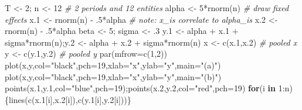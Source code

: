 \documentclass[
  12pt,
]{book}
\newenvironment{Shaded}{\begin{snugshade}}{\end{snugshade}}
\newcommand{\AttributeTok}[1]{\textcolor[rgb]{0.77,0.63,0.00}{#1}}
\newcommand{\CommentTok}[1]{\textcolor[rgb]{0.56,0.35,0.01}{\textit{#1}}}
\newcommand{\ControlFlowTok}[1]{\textcolor[rgb]{0.13,0.29,0.53}{\textbf{#1}}}
\newcommand{\DecValTok}[1]{\textcolor[rgb]{0.00,0.00,0.81}{#1}}
\newcommand{\FloatTok}[1]{\textcolor[rgb]{0.00,0.00,0.81}{#1}}
\newcommand{\FunctionTok}[1]{\textcolor[rgb]{0.00,0.00,0.00}{#1}}
\newcommand{\NormalTok}[1]{#1}
\newcommand{\OtherTok}[1]{\textcolor[rgb]{0.56,0.35,0.01}{#1}}
\newcommand{\SpecialCharTok}[1]{\textcolor[rgb]{0.00,0.00,0.00}{#1}}
\newcommand{\StringTok}[1]{\textcolor[rgb]{0.31,0.60,0.02}{#1}}
\theoremstyle{definition}
\theoremstyle{definition}
\theoremstyle{definition}
\theoremstyle{definition}
\theoremstyle{remark}
\begin{document}
\begin{Shaded}
\begin{Highlighting}[]
\NormalTok{T }\OtherTok{\textless{}{-}} \DecValTok{2}\NormalTok{; n }\OtherTok{\textless{}{-}} \DecValTok{12} \CommentTok{\# 2 periods and 12 entities}
\NormalTok{alpha }\OtherTok{\textless{}{-}} \DecValTok{5}\SpecialCharTok{*}\FunctionTok{rnorm}\NormalTok{(n) }\CommentTok{\# draw fixed effects}
\NormalTok{x}\FloatTok{.1} \OtherTok{\textless{}{-}} \FunctionTok{rnorm}\NormalTok{(n) }\SpecialCharTok{{-}}\NormalTok{ .}\DecValTok{5}\SpecialCharTok{*}\NormalTok{alpha }\CommentTok{\# note: x\_i\textquotesingle{}s correlate to alpha\_i\textquotesingle{}s}
\NormalTok{x}\FloatTok{.2} \OtherTok{\textless{}{-}} \FunctionTok{rnorm}\NormalTok{(n) }\SpecialCharTok{{-}}\NormalTok{ .}\DecValTok{5}\SpecialCharTok{*}\NormalTok{alpha}
\NormalTok{beta }\OtherTok{\textless{}{-}} \DecValTok{5}\NormalTok{; sigma }\OtherTok{\textless{}{-}}\NormalTok{ .}\DecValTok{3}
\NormalTok{y}\FloatTok{.1} \OtherTok{\textless{}{-}}\NormalTok{ alpha }\SpecialCharTok{+}\NormalTok{ x}\FloatTok{.1} \SpecialCharTok{+}\NormalTok{ sigma}\SpecialCharTok{*}\FunctionTok{rnorm}\NormalTok{(n);y}\FloatTok{.2} \OtherTok{\textless{}{-}}\NormalTok{ alpha }\SpecialCharTok{+}\NormalTok{ x}\FloatTok{.2} \SpecialCharTok{+}\NormalTok{ sigma}\SpecialCharTok{*}\FunctionTok{rnorm}\NormalTok{(n)}
\NormalTok{x }\OtherTok{\textless{}{-}} \FunctionTok{c}\NormalTok{(x}\FloatTok{.1}\NormalTok{,x}\FloatTok{.2}\NormalTok{) }\CommentTok{\# pooled x}
\NormalTok{y }\OtherTok{\textless{}{-}} \FunctionTok{c}\NormalTok{(y}\FloatTok{.1}\NormalTok{,y}\FloatTok{.2}\NormalTok{) }\CommentTok{\# pooled y}
\FunctionTok{par}\NormalTok{(}\AttributeTok{mfrow=}\FunctionTok{c}\NormalTok{(}\DecValTok{1}\NormalTok{,}\DecValTok{2}\NormalTok{))}
\FunctionTok{plot}\NormalTok{(x,y,}\AttributeTok{col=}\StringTok{"black"}\NormalTok{,}\AttributeTok{pch=}\DecValTok{19}\NormalTok{,}\AttributeTok{xlab=}\StringTok{"x"}\NormalTok{,}\AttributeTok{ylab=}\StringTok{"y"}\NormalTok{,}\AttributeTok{main=}\StringTok{"(a)"}\NormalTok{)}
\FunctionTok{plot}\NormalTok{(x,y,}\AttributeTok{col=}\StringTok{"black"}\NormalTok{,}\AttributeTok{pch=}\DecValTok{19}\NormalTok{,}\AttributeTok{xlab=}\StringTok{"x"}\NormalTok{,}\AttributeTok{ylab=}\StringTok{"y"}\NormalTok{,}\AttributeTok{main=}\StringTok{"(b)"}\NormalTok{)}
\FunctionTok{points}\NormalTok{(x}\FloatTok{.1}\NormalTok{,y}\FloatTok{.1}\NormalTok{,}\AttributeTok{col=}\StringTok{"blue"}\NormalTok{,}\AttributeTok{pch=}\DecValTok{19}\NormalTok{);}\FunctionTok{points}\NormalTok{(x}\FloatTok{.2}\NormalTok{,y}\FloatTok{.2}\NormalTok{,}\AttributeTok{col=}\StringTok{"red"}\NormalTok{,}\AttributeTok{pch=}\DecValTok{19}\NormalTok{)}
\ControlFlowTok{for}\NormalTok{(i }\ControlFlowTok{in} \DecValTok{1}\SpecialCharTok{:}\NormalTok{n)\{}\FunctionTok{lines}\NormalTok{(}\FunctionTok{c}\NormalTok{(x}\FloatTok{.1}\NormalTok{[i],x}\FloatTok{.2}\NormalTok{[i]),}\FunctionTok{c}\NormalTok{(y}\FloatTok{.1}\NormalTok{[i],y}\FloatTok{.2}\NormalTok{[i]))\}}
\end{Highlighting}
\end{Shaded}
\end{document}
